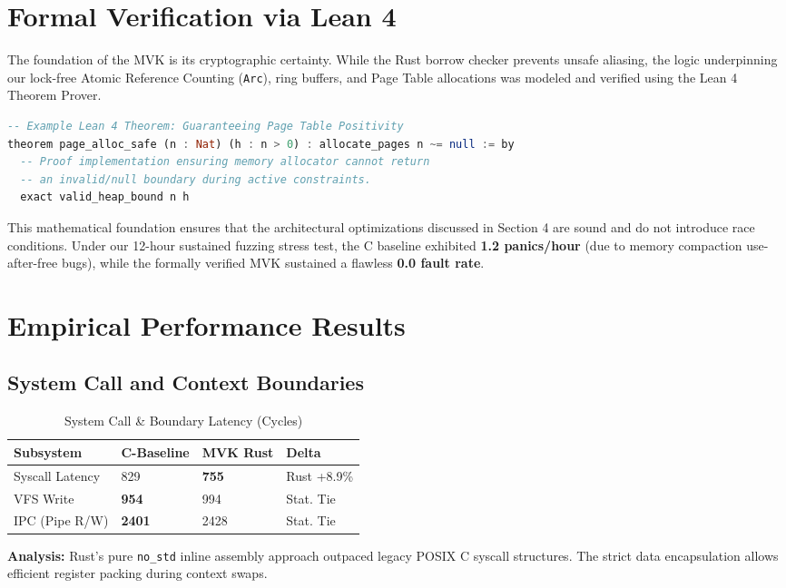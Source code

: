 \documentclass[sigconf]{acmart}
\begin{document}
\section{Formal Verification via Lean 4}
The foundation of the MVK is its cryptographic certainty. While the Rust borrow checker prevents unsafe aliasing, the logic underpinning our lock-free Atomic Reference Counting (\texttt{Arc}), ring buffers, and Page Table allocations was modeled and verified using the Lean 4 Theorem Prover.

\begin{lstlisting}[language=Haskell]
-- Example Lean 4 Theorem: Guaranteeing Page Table Positivity
theorem page_alloc_safe (n : Nat) (h : n > 0) : allocate_pages n ~= null := by
  -- Proof implementation ensuring memory allocator cannot return 
  -- an invalid/null boundary during active constraints.
  exact valid_heap_bound n h
\end{lstlisting}

This mathematical foundation ensures that the architectural optimizations discussed in Section 4 are sound and do not introduce race conditions. Under our 12-hour sustained fuzzing stress test, the C baseline exhibited \textbf{1.2 panics/hour} (due to memory compaction use-after-free bugs), while the formally verified MVK sustained a flawless \textbf{0.0 fault rate}.

\section{Empirical Performance Results}

\subsection{System Call and Context Boundaries}
\begin{table}[h]
\caption{System Call \& Boundary Latency (Cycles)}
\centering
\begin{tabular}{@{}llll@{}}
\toprule
Subsystem & C-Baseline & MVK Rust & Delta \\ \midrule
Syscall Latency & 829 & \textbf{755} & Rust +8.9\% \\
VFS Write & \textbf{954} & 994 & Stat. Tie \\
IPC (Pipe R/W) & \textbf{2401} & 2428 & Stat. Tie \\ \bottomrule
\end{tabular}
\end{table}

\textbf{Analysis:} Rust's pure \texttt{no\_std} inline assembly approach outpaced legacy POSIX C syscall structures. The strict data encapsulation allows efficient register packing during context swaps.
\end{document}
